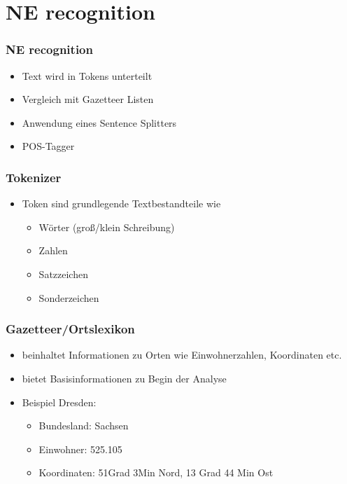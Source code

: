 \section{NE recognition}
\label{sec:ne-recognition}

\begin{frame}
  \frametitle{NE recognition}

  \begin{itemize}
  \item Text wird in Tokens unterteilt
  \item Vergleich mit Gazetteer Listen
  \item Anwendung eines Sentence Splitters
  \item POS-Tagger 
  \end{itemize}
\end{frame}

\begin{frame}
  \frametitle{Tokenizer}
  
  \begin{itemize}
  \item Token sind grundlegende Textbestandteile wie
    \begin{itemize}
      \item Wörter (groß/klein Schreibung)
      \item Zahlen
      \item Satzzeichen
      \item Sonderzeichen
    \end{itemize}
  \end{itemize}
\end{frame}

\begin{frame}
  \frametitle{Gazetteer/Ortslexikon}

  \begin{itemize}
  \item beinhaltet Informationen zu Orten wie Einwohnerzahlen, Koordinaten etc.
  \item bietet Basisinformationen zu Begin der Analyse
  \item Beispiel Dresden:
    \begin{itemize}
    \item Bundesland: Sachsen
    \item Einwohner: 525.105
    \item Koordinaten: 51Grad 3Min Nord, 13 Grad 44 Min Ost
    \end{itemize}
  \end{itemize}
\end{frame}

